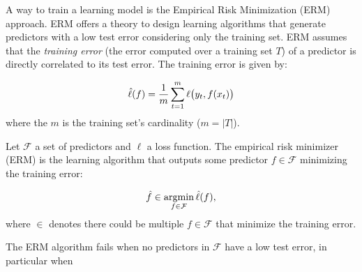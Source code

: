 A way to train a learning model is the Empirical Risk Minimization (ERM) approach. ERM offers a theory to design learning algorithms that generate predictors with a low test error considering only the training set. ERM assumes that the \textit{training error} (the error computed over a training set $T$) of a predictor is directly correlated to its test error. The training error is given by:

\begin{equation}
\hat \ell(f) = \frac{1}{m} \sum_{t=1}^{m}\ell\big{(}y_t, f(x_t)\big{)}
\end{equation}
where the $m$ is the training set's cardinality ($m = |T|$).

\begin{definition} 
	Let $\mathcal{F}$ a set of predictors and $\ell$ a loss function. The empirical risk minimizer (ERM) is the learning algorithm that outputs some predictor $f \in \mathcal{F}$ minimizing the training error:
	
	\begin{equation}
	\hat f \in \operatorname*{argmin}_{f \in \mathcal{F}} \hat \ell(f),
	\end{equation}
	where $\in$ denotes there could be multiple $f \in \mathcal{F}$ that minimize the training error.
\end{definition}

The ERM algorithm fails when no predictors in $\mathcal{F}$ have a low test error, in particular when

